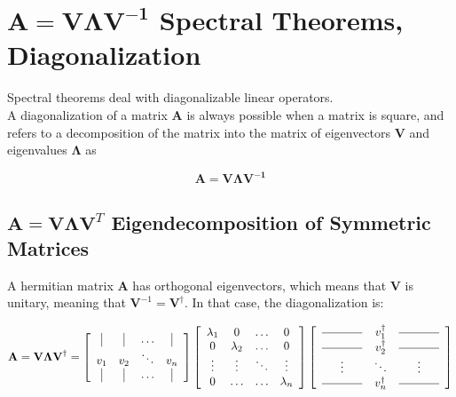 \section{$\mathbf{A} = \mathbf{V\Lambda V^{-1}}$ Spectral Theorems, Diagonalization}
\label{sec:diagonalization}

Spectral theorems deal with diagonalizable linear operators. 
\\

A diagonalization of a matrix $\mathbf{A}$ is always possible when a matrix is square, and refers to a decomposition of the matrix into the matrix of eigenvectors $\mathbf{V}$ and eigenvalues $\mathbf{\Lambda}$ as 

\begin{equation}
\mathbf{A} = \mathbf{V\Lambda V^{-1}} 
\end{equation}

\subsection{$\mathbf{A} = \mathbf{V\Lambda V}^T$ Eigendecomposition of Symmetric Matrices}
A hermitian matrix $\mathbf{A}$ has orthogonal eigenvectors, which means that $\mathbf{V}$ is unitary, meaning that $\mathbf{V}^{-1} = \mathbf{V}^{\dagger}$. In that case, the diagonalization is:

\begin{equation}
\mathbf{A} = \mathbf{V\Lambda V}^{\dagger} = \left[\begin{array}{cccc}
\vrule&\vrule&\hdots&\vrule\\
v_1&v_2&\ddots&v_n\\
\vrule&\vrule&\hdots&\vrule
\end{array}\right]\left[\begin{array}{cccc}
\lambda_1&0&\hdots&0\\ 
0&\lambda_2&\hdots&0\\
\vdots&\vdots&\ddots&\vdots\\
0&\hdots&\hdots&\lambda_n
\end{array}\right]
\left[
\begin{array}{ccc}
\rule[.5ex]{3.5em}{0.4pt}&v_1^{\dagger}&\rule[.5ex]{3.5em}{0.4pt}\\
\rule[.5ex]{3.5em}{0.4pt}&v_2^{\dagger}&\rule[.5ex]{3.5em}{0.4pt}\\
\vdots&\ddots&\vdots\\
\rule[.5ex]{3.5em}{0.4pt}&v_n^{\dagger}&\rule[.5ex]{3.5em}{0.4pt}\\
\end{array}
\right]
\end{equation}

